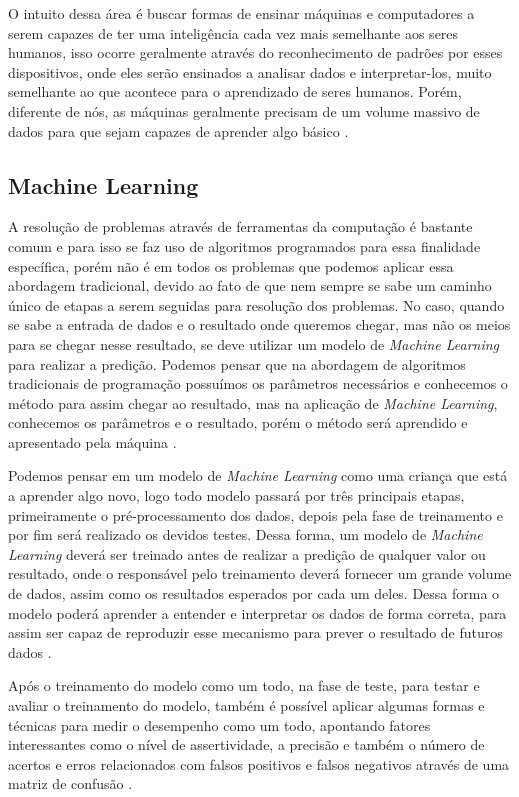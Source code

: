 O intuito dessa área é buscar formas de ensinar máquinas e computadores a serem capazes de ter uma inteligência cada vez mais semelhante aos seres humanos, isso ocorre geralmente através do reconhecimento de padrões por esses dispositivos, onde eles serão ensinados a analisar dados e interpretar-los, muito semelhante ao que acontece para o aprendizado de seres humanos. Porém, diferente de nós, as máquinas geralmente precisam de um volume massivo de dados para que sejam capazes de aprender algo básico \cite{IAAprendizadoMaquina}.

\subsection{Machine Learning}

A resolução de problemas através de ferramentas da computação é bastante comum e para isso se faz uso de algoritmos programados para essa finalidade específica, porém não é em todos os problemas que podemos aplicar essa abordagem tradicional, devido ao fato de que nem sempre se sabe um caminho único de etapas a serem seguidas para resolução dos problemas. No caso, quando se sabe a entrada de dados e o resultado onde queremos chegar, mas não os meios para se chegar nesse resultado, se deve utilizar um modelo de \emph{Machine Learning} para realizar a predição. Podemos pensar que na abordagem de algoritmos tradicionais de programação possuímos os parâmetros necessários e conhecemos o método para assim chegar ao resultado, mas na aplicação de \emph{Machine Learning}, conhecemos os parâmetros e o resultado, porém o método será aprendido e apresentado pela máquina \cite{machineLearning}.

Podemos pensar em um modelo de \emph{Machine Learning} como uma criança que está a aprender algo novo, logo todo modelo passará por três principais etapas, primeiramente o pré-processamento dos dados, depois pela fase de treinamento e por fim será realizado os devidos testes. Dessa forma, um modelo de \emph{Machine Learning} deverá ser treinado antes de realizar a predição de qualquer valor ou resultado, onde o responsável pelo treinamento deverá fornecer um grande volume de dados, assim como os resultados esperados por cada um deles. Dessa forma o modelo poderá aprender a entender e interpretar os dados de forma correta, para assim ser capaz de reproduzir esse mecanismo para prever o resultado de futuros dados \cite{machineLearningPython}.

Após o treinamento do modelo como um todo, na fase de teste, para testar e avaliar o treinamento do modelo, também é possível aplicar algumas formas e técnicas para medir o desempenho como um todo, apontando fatores interessantes como o nível de assertividade, a precisão e também o número de acertos e erros relacionados com falsos positivos e falsos negativos através de uma matriz de confusão \cite{machineLearningTensorFlow}.

